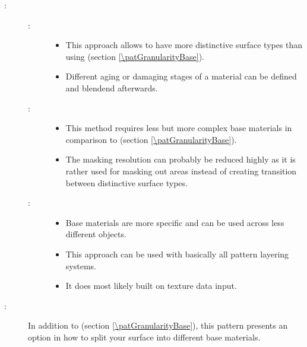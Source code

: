 \begin{description}
	\item[\patConsequences:]\hfill 
		\begin{description}
			\item[\visual:]\hfill
			\begin{itemize}\mynobreakpar
				\item This approach allows to have more distinctive surface types than using \emph{\patGranularityBase} (section \ref{\patGranularityBase}).
				\item Different aging or damaging stages of a material can be defined and blendend afterwards.
			\end{itemize}
			\item[\performance:]\hfill
			\begin{itemize}\mynobreakpar
				\item This method requires less but more complex base materials in comparison to \emph{\patGranularityBase} (section \ref{\patGranularityBase}).
				\item The masking resolution can probably be reduced highly as it is rather used for masking out areas instead of creating transition between distinctive surface types. 
			\end{itemize}
			\item[\pipeline:]\hfill
			\begin{itemize}\mynobreakpar
				\item Base materials are more specific and can be used across less different objects. 
				\item This approach can be used with basically all pattern layering systems. 
				\item It does most likely built on texture data input. 
			\end{itemize}
		\end{description}
	\item[\patRelations:]%
	In addition to \emph{\patGranularityBase} (section \ref{\patGranularityBase}), this pattern presents an option in how to split your surface into different base materials.
\end{description}

